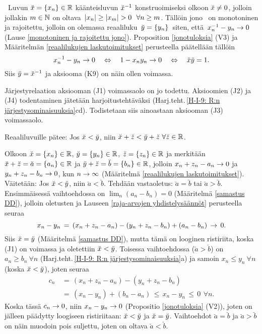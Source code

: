  \ Luvun $\x = \seq{x_n} \in \R$ käänteisluvun $\x^{-1}$ konstruoimiseksi olkoon 
\mbox{$\x \neq 0$}, jolloin jollakin $m \in \mathbb N$ on oltava
$\,\vert x_n\vert \ge \vert x_m\vert > 0\ \ \forall n \ge m$.
Tällöin jono \ on monotoninen ja rajoitettu, jolloin
on olemassa reaaliluku $\,\y = \seq{y_n}\,$ siten, että $\,x_n^{-1}-y_n \rightarrow 0$ 
(Lause \ref{monotoninen ja rajoitettu jono}). Proposition \ref{jonotuloksia} (V3) ja
Määritelmän \ref{reaalilukujen laskutoimitukset} perusteella päätellään tällöin
\[
x_n^{-1} - y_n \kohti 0 \quad \ekv \quad 1 - x_n y_n \kohti 0 \quad \ekv \quad \x\y = 1.
\]
Siis $\y = \x^{-1}$ ja aksiooma (K9) on näin ollen voimassa. \loppu

Järjestyrelaation aksiooman (J1) voimassaolo on jo todettu. Aksioomien (J2) ja (J4)
todentaminen jätetään harjoitustehtäväksi
(Harj.teht.\,\ref{H-I-9: R:n järjestysominaisuuksia}cd). Todistetaan siis ainoastaan aksiooman
(J3) voimassaolo.
\begin{Prop} \label{R:n aksiooma (J3)} Reaaliluvuille pätee: Jos $\x<\y$, niin
$\x+\z<\y+\z\ \forall \z\in\R$.
\end{Prop}
\tod Olkoon $\x=\seq{x_n}\in\R$, $\y=\seq{y_n}\in\R$, $\z=\seq{z_n}\in\R$ ja merkitään
$\x+\z=\breve{a}=\seq{a_n}\in\R$ ja $\y+\z=\breve{b}=\seq{b_n}\in\R$, jolloin
$x_n+z_n-a_n \rightarrow 0$ ja $y_n+z_n-b_n \rightarrow 0$, kun $n\rightarrow\infty$
(Määritelmä \ref{reaalilukujen laskutoimitukset}). Väitetään: Jos $\x<\y$, niin
$\breve{a}<\breve{b}$. Tehdään vastaoletus: $\breve{a}=\breve{b}$ tai 
$\breve{a}>\breve{b}$. Ensimmäisessä vaihtoehdossa on $\lim_n(a_n-b_n)=0$
(Määritelmä \ref{samastus DD}), jolloin oletusten ja Lauseen 
\ref{raja-arvojen yhdistelysäännöt} perusteella seuraa
\[
x_n-y_n \,=\, (x_n+z_n-a_n)-(y_n+z_n-b_n)+(a_n-b_n) \,\rightarrow\, 0.
\]
Siis $\x=\y$ (Määritelmä \ref{samastus DD}), mutta tämä on looginen ristiriita,
koska (J1) on voimassa ja oletettiin $\x<\y$. Toisessa vaihtoehdossa
($\breve{a}>\breve{b}$) on $a_n \ge b_n\ \forall n$
(Harj.teht.\,\ref{H-I-9: R:n järjestysominaisuuksia}a) ja samoin
$x_n \le y_n\ \forall n$ (koska $\x<\y$), joten seuraa
\begin{align*}
c_n \,&=\, (x_n+z_n-a_n)-(y_n+z_n-b_n) \\ 
      &=\, (x_n-y_n)+(b_n-a_n) \,\le\, x_n-y_n \,\le\, 0\,\ \forall n.
\end{align*}
Koska tässä $c_n \rightarrow 0$, niin $x_n-y_n \rightarrow 0$ (Propositio \ref{jonotuloksia} (V2)),
joten on jälleen päädytty loogiseen ristiriitaan: $\x<\y$ ja $\x=\y$. Vaihtoehdot
$\breve{a}=\breve{b}$ ja $\breve{a}>\breve{b}$ on näin muodoin pois suljettu, joten on
oltava $\breve{a}<\breve{b}$. \loppu

